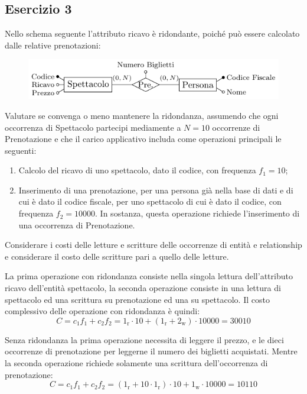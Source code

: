 \documentclass{article}
\numberwithin{equation}{subsection}
\begin{document}
\subsection{Esercizio 3}

Nello schema seguente l'attributo ricavo è ridondante, poiché può essere calcolato dalle relative prenotazioni: 

\begin{figure}[H]%
    \centering
    \includegraphics[scale=1.25]{domanda_2-12-24.pdf}%
\end{figure}

Valutare se convenga o meno mantenere la ridondanza, assumendo che ogni occorrenza di Spettacolo partecipi mediamente a $N=10$ occorrenze di Prenotazione e che il carico applicativo includa 
come operazioni principali le seguenti:
\begin{enumerate}
    \item Calcolo del ricavo di uno spettacolo, dato il codice, con frequenza $f_1 = 10$;
    \item Inserimento di una prenotazione, per una persona già nella base di dati e di cui è dato il codice fiscale, per uno spettacolo di cui è dato il codice, con frequenza $f_2 = 10000$. 
    In sostanza, questa operazione richiede l'inserimento di una occorrenza di Prenotazione. 
\end{enumerate}
Considerare i costi delle letture e scritture delle occorrenze di entità e relationship e considerare il costo delle scritture pari a quello delle letture. 

La prima operazione con ridondanza consiste nella singola lettura dell'attributo ricavo dell'entità spettacolo, la seconda 
operazione consiste in una lettura di spettacolo ed una scrittura su prenotazione ed una su spettacolo. Il 
costo complessivo delle operazione con ridondanza è quindi:
\begin{equation*}
    C=c_1f_1+c_2f_2=1_\mathrm{r}\cdot10+(1_\mathrm{r}+2_\mathrm{w})\cdot10000=30010
\end{equation*}

Senza ridondanza la prima operazione necessita di leggere il prezzo, e le dieci occorrenze di 
prenotazione per leggerne il numero dei biglietti acquistati. Mentre la 
seconda operazione richiede solamente una scrittura dell'occorrenza di prenotazione:
\begin{equation*}
    C=c_1f_1+c_2f_2=(1_\mathrm{r}+10\cdot1_\mathrm{r})\cdot10+1_\mathrm{w}\cdot10000=10110
\end{equation*}
\end{document}
